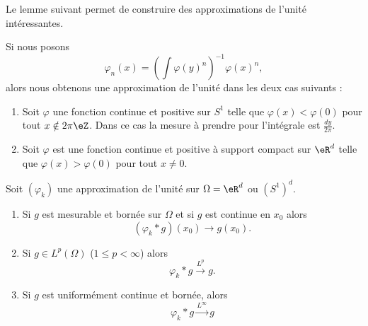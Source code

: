 Le lemme suivant permet de construire des approximations de l'unité intéressantes.
\begin{lemma}   \label{LemCNjIYhv}
    Si nous posons
    \begin{equation}
        \varphi_n(x)=\left( \int\varphi(y)^n \right)^{-1}\varphi(x)^n,
    \end{equation}
    alors nous obtenons une approximation de l'unité dans les deux cas suivants :
    \begin{enumerate}
        \item
            Soit \( \varphi\) une fonction continue et positive sur \( S^1\) telle que \( \varphi(x)<\varphi(0)\) pour tout \( x\notin 2\pi \eZ\). Dans ce cas la mesure à prendre pour l'intégrale est \( \frac{ dy }{ 2\pi }\).
        \item
            Soit \( \varphi\) est une fonction continue et positive à support compact sur \( \eR^d\) telle que \( \varphi(x)>\varphi(0)\) pour tout \( x\neq 0\).

    \end{enumerate}
\end{lemma}

\begin{theorem} \label{ThoYQbqEez}
    Soit \( (\varphi_k)\) une approximation de l'unité sur \( \Omega=\eR^d\) ou \( (S^1)^d\).
    \begin{enumerate}
        \item
            Si \( g\) est mesurable et bornée sur \( \Omega\) et si \( g\) est continue en \( x_0\) alors
            \begin{equation}
                (\varphi_k*g)(x_0)\to g(x_0).
            \end{equation}
        \item
            Si \( g\in L^p(\Omega)\) (\( 1\leq p<\infty\)) alors
            \begin{equation}
                \varphi_k*g\stackrel{L^p}{\to}g.
            \end{equation}
        \item
            Si \( g\) est uniformément continue et bornée, alors
            \begin{equation}
                \varphi_k*g\stackrel{L^{\infty}}{\to}g
            \end{equation}
    \end{enumerate}
\end{theorem}

